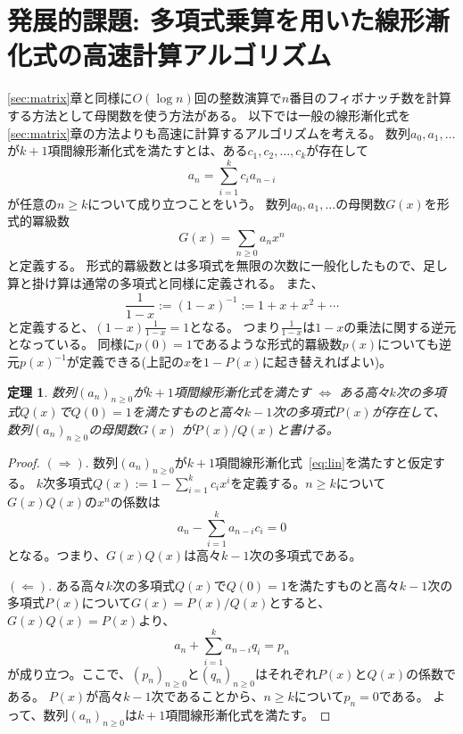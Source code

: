 \documentclass[a4paper,twoside,onecolumn,openany,article]{memoir}
\theoremstyle{plain}
\newtheorem{theorem}{定理}
\theoremstyle{remark}
\begin{document}
\section{発展的課題: 多項式乗算を用いた線形漸化式の高速計算アルゴリズム}
\ref{sec:matrix}章と同様に$O(\log n)$回の整数演算で$n$番目のフィボナッチ数を計算する方法として母関数を使う方法がある。
以下では一般の線形漸化式を\ref{sec:matrix}章の方法よりも高速に計算するアルゴリズムを考える。
数列$a_0,a_1,\dotsc$が$k+1$項間線形漸化式を満たすとは、ある$c_1,c_2,\dotsc,c_k$が存在して
\begin{equation}
a_n = \sum_{i=1}^k c_i a_{n-i}
\label{eq:lin}
\end{equation}
が任意の$n\ge k$について成り立つことをいう。
数列$a_0,a_1,\dotsc$の母関数$G(x)$を形式的冪級数
\begin{equation*}
G(x)=\sum_{n\ge 0} a_n x^n
\end{equation*}
と定義する。
形式的羃級数とは多項式を無限の次数に一般化したもので、足し算と掛け算は通常の多項式と同様に定義される。
また、
\begin{equation*}
\frac1{1-x} := (1-x)^{-1} := 1+x+x^2+\dotsb
\end{equation*}
と定義すると、$(1-x) \frac1{1-x} = 1$となる。
つまり$\frac1{1-x}$は$1-x$の乗法に関する逆元となっている。
同様に$p(0)= 1$であるような形式的羃級数$p(x)$についても逆元$p(x)^{-1}$が定義できる(上記の$x$を$1-P(x)$に起き替えればよい)。
\begin{theorem}\label{thm:lin}
数列$(a_n)_{n\ge 0}$が$k+1$項間線形漸化式を満たす $\iff$ ある高々$k$次の多項式$Q(x)$で$Q(0)=1$を満たすものと高々$k-1$次の多項式$P(x)$が存在して、数列$(a_n)_{n\ge 0}$の母関数$G(x)$
が$P(x)/Q(x)$と書ける。
\end{theorem}
\begin{proof}
$(\Rightarrow).$
数列$(a_n)_{n\ge 0}$が$k+1$項間線形漸化式~\eqref{eq:lin}を満たすと仮定する。
$k$次多項式$Q(x):=1-\sum_{i=1}^k c_i x^i$を定義する。$n\ge k$について$G(x)Q(x)$の$x^n$の係数は
\begin{equation*}
a_n - \sum_{i=1}^k a_{n-i} c_i = 0
\end{equation*}
となる。つまり、$G(x)Q(x)$は高々$k-1$次の多項式である。

$(\Leftarrow).$
ある高々$k$次の多項式$Q(x)$で$Q(0)=1$を満たすものと高々$k-1$次の多項式$P(x)$について$G(x)=P(x)/Q(x)$とすると、$G(x)Q(x)=P(x)$より、
\begin{equation*}
a_n + \sum_{i=1}^k a_{n-i} q_i = p_n
\end{equation*}
が成り立つ。ここで、$(p_n)_{n\ge 0}$と$(q_n)_{n\ge 0}$はそれぞれ$P(x)$と$Q(x)$の係数である。
$P(x)$が高々$k-1$次であることから、$n\ge k$について$p_n=0$である。
よって、数列$(a_n)_{n\ge 0}$は$k+1$項間線形漸化式を満たす。
\end{proof}
\end{document}
